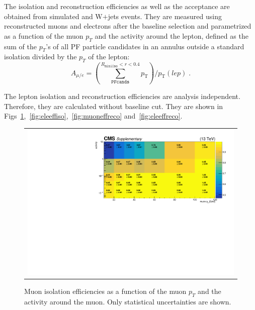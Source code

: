 The isolation and reconstruction efficiencies as well as the acceptance are obtained from simulated \ttbar and W$+$jets events. They are measured using reconstructed muons and electrons after the baseline selection and parametrized as a function of the muon $p_T$ and the activity around the lepton, defined as the sum of the $p_{T}$'s of all PF particle candidates in an annulus outside a standard isolation divided by the $p_T$ of the lepton:
\begin{equation}
\textit{$A_{\mu/e}$}=\left(\sum^{R_\texttt{miniIso}<r<0.4}_\texttt{PFcands} p_\text{T}\right) / p_\text{T}(lep) \; .
\label{eq:activity}
\end{equation}

The lepton isolation and reconstruction efficiencies are analysis independent. Therefore, they are calculated without baseline cut. They are shown in Figs~\ref{fig:muoneffiso},~\ref{fig:eleeffiso},~\ref{fig:muoneffreco} and~\ref{fig:eleeffreco}.

\begin{figure}[hptb]
\begin{center}
\begin{tabular}{c}
\includegraphics[width=1.0\textwidth]{sections/mc4/Backgrounds/LostLepton/figures/v3_2d_effs_mus_iso_no_baseline.pdf}
\end{tabular}
\end{center}
\caption{Muon isolation efficiencies as a function of the muon $p_T$ and the activity around the muon. Only statistical uncertainties are shown.}
\label{fig:muoneffiso}
\end{figure}

